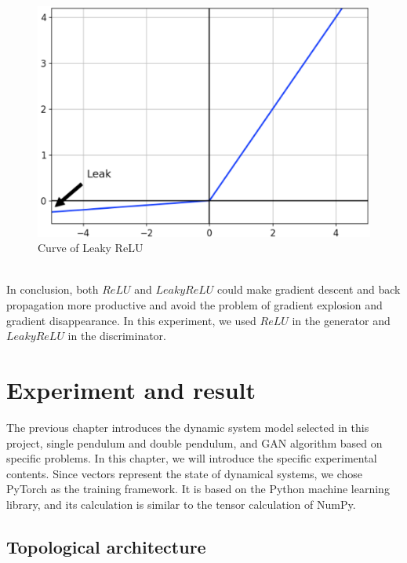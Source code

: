 \documentclass[11pt,a4paper]{article}
\begin{document}
\begin{figure}[ht!]
\centering
\includegraphics[scale=0.2]{11.png}
\caption{Curve of Leaky ReLU}
\label{fig:Curve of Leaky ReLU}
\end{figure}
\\
In conclusion, both $ReLU$ and $Leaky ReLU$ could make gradient descent and back propagation more productive and avoid the problem of gradient explosion and gradient disappearance. In this experiment, we used $ReLU$ in the generator and $Leaky ReLU$ in the discriminator.
\newpage
\section{Experiment and result}
The previous chapter introduces the dynamic system model selected in this project, single pendulum and double pendulum, and GAN algorithm based on specific problems. In this chapter, we will introduce the specific experimental contents. Since vectors represent the state of dynamical systems, we chose PyTorch as the training framework. It is based on the Python machine learning library, and its calculation is similar to the tensor calculation of NumPy.
\\
\subsection{Topological architecture}
\end{document}
